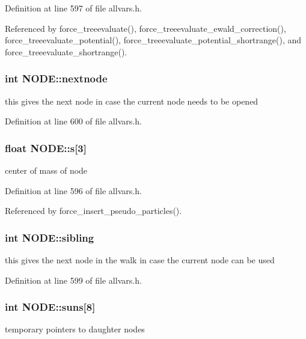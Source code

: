 Definition at line 597 of file allvars.h.



Referenced by force\_\-treeevaluate(), force\_\-treeevaluate\_\-ewald\_\-correction(), force\_\-treeevaluate\_\-potential(), force\_\-treeevaluate\_\-potential\_\-shortrange(), and force\_\-treeevaluate\_\-shortrange().

\hypertarget{structNODE_aabf4865245a8afbec1e1cb8e664f41e8}{
\subsubsection[{nextnode}]{\setlength{\rightskip}{0pt plus 5cm}int {\bf NODE::nextnode}}}
\label{structNODE_aabf4865245a8afbec1e1cb8e664f41e8}
this gives the next node in case the current node needs to be opened 

Definition at line 600 of file allvars.h.

\hypertarget{structNODE_a97ef917e39b0cc8a4aae6e6362c4b3bf}{
\subsubsection[{s}]{\setlength{\rightskip}{0pt plus 5cm}float {\bf NODE::s}\mbox{[}3\mbox{]}}}
\label{structNODE_a97ef917e39b0cc8a4aae6e6362c4b3bf}
center of mass of node 

Definition at line 596 of file allvars.h.



Referenced by force\_\-insert\_\-pseudo\_\-particles().

\hypertarget{structNODE_a0e5a3f58232208e4ad8570f801bf5713}{
\subsubsection[{sibling}]{\setlength{\rightskip}{0pt plus 5cm}int {\bf NODE::sibling}}}
\label{structNODE_a0e5a3f58232208e4ad8570f801bf5713}
this gives the next node in the walk in case the current node can be used 

Definition at line 599 of file allvars.h.

\hypertarget{structNODE_a2a31ed85a69cd67dce1861bd327ac6e9}{
\subsubsection[{suns}]{\setlength{\rightskip}{0pt plus 5cm}int {\bf NODE::suns}\mbox{[}8\mbox{]}}}
\label{structNODE_a2a31ed85a69cd67dce1861bd327ac6e9}
temporary pointers to daughter nodes 

